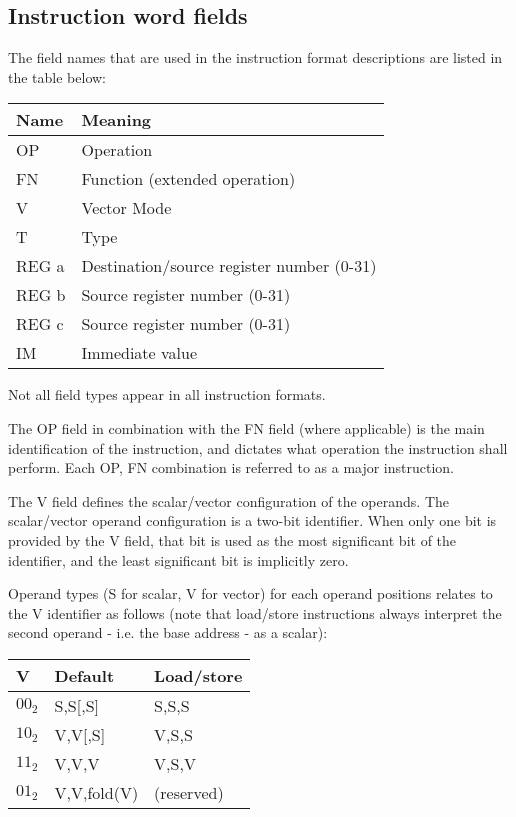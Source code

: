 \subsection{Instruction word fields}

The field names that are used in the instruction format descriptions are listed
in the table below:

\begin{tabular}{|l|l|}
  \hline
  \textbf{Name} & \textbf{Meaning} \\
  \hline
  OP & Operation \\
  \hline
  FN & Function (extended operation) \\
  \hline
  V  & Vector Mode \\
  \hline
  T  & Type \\
  \hline
  REG a & Destination/source register number (0-31) \\
  \hline
  REG b & Source register number (0-31) \\
  \hline
  REG c & Source register number (0-31) \\
  \hline
  IM & Immediate value \\
  \hline
\end{tabular}

Not all field types appear in all instruction formats.

The OP field in combination with the FN field (where applicable) is the main
identification of the instruction, and dictates what operation the instruction
shall perform. Each OP, FN combination is referred to as a major instruction.

The V field defines the scalar/vector configuration of the operands. The
scalar/vector operand configuration is a two-bit identifier. When only one bit
is provided by the V field, that bit is used as the most significant bit of the
identifier, and the least significant bit is implicitly zero.

Operand types (S for scalar, V for vector) for each operand positions relates
to the V identifier as follows (note that load/store instructions always
interpret the second operand - i.e. the base address - as a scalar):

\begin{tabular}{|l|l|l|}
  \hline
  \textbf{V} & \textbf{Default} & \textbf{Load/store} \\
  \hline
  $00_{2}$ & S,S[,S] & S,S,S \\
  \hline
  $10_{2}$ & V,V[,S] & V,S,S \\
  \hline
  $11_{2}$ & V,V,V & V,S,V \\
  \hline
  $01_{2}$ & V,V,fold(V) & (reserved) \\
  \hline
\end{tabular}

